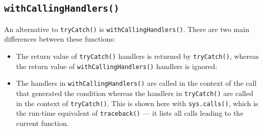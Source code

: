 \subsection{\texttt{withCallingHandlers()}}

An alternative to \texttt{tryCatch()} is \texttt{withCallingHandlers()}.
There are two main differences between these functions:

\begin{itemize}
\item
  The return value of \texttt{tryCatch()} handlers is returned by
  \texttt{tryCatch()}, whereas the return value of
  \texttt{withCallingHandlers()} handlers is ignored:

\begin{Shaded}
\begin{Highlighting}[]
\StringTok{ }\NormalTok{(}\NormalTok{)}
\NormalTok{(}\NormalTok{(), } \NormalTok{)}
\NormalTok{(}\NormalTok{(), } \NormalTok{)}
\end{Highlighting}
\end{Shaded}
\item
  The handlers in \texttt{withCallingHandlers()} are called in the
  context of the call that generated the condition whereas the handlers
  in \texttt{tryCatch()} are called in the context of
  \texttt{tryCatch()}. This is shown here with \texttt{sys.calls()},
  which is the run-time equivalent of \texttt{traceback()} --- it lists
  all calls leading to the current function.

\begin{Shaded}
\begin{Highlighting}[]
\StringTok{ }\NormalTok{()}
\StringTok{ }\NormalTok{()}
\StringTok{ }\NormalTok{(}\NormalTok{)}

\NormalTok{(}\NormalTok{(), } \NormalTok{(}\NormalTok{()))}


\end{Highlighting}
\end{Shaded}
\end{itemize}
